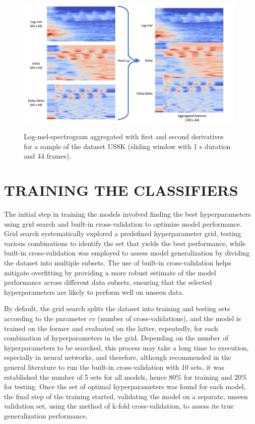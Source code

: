 \begin{figure}[htbp]
    \raggedright
        \caption{Log-mel-spectrogram aggregated with first and second derivatives for a sample of the dataset US8K (sliding window with 1 \gls{s} duration and 44 frames).}
        \includegraphics[width=1\textwidth]{resources/images/050-methods/Methods_feature_extraction_3_US8K.jpg}
        \label{fig:methods_feature_extraction_log-mel_spectrogram}
\end{figure}

\section{TRAINING THE CLASSIFIERS}
\label{sec:methods_training_classifiers}

The initial step in training the models involved finding the best hyperparameters using grid search and built-in cross-validation \cite{scikitle61} to optimize model performance. Grid search systematically explored a predefined hyperparameter grid, testing various combinations to identify the set that yields the best performance, while built-in cross-validation was employed to assess model generalization by dividing the dataset into multiple subsets. The use of built-in cross-validation helps mitigate overfitting by providing a more robust estimate of the model performance across different data subsets, ensuring that the selected hyperparameters are likely to perform well on unseen data.

By default, the grid search splits the dataset into training and testing sets according to the parameter $cv$ (number of cross-validations), and the model is trained on the former and evaluated on the latter, repeatedly, for each combination of hyperparameters in the grid. Depending on the number of hyperparameters to be searched, this process may take a long time to execution, especially in neural networks, and therefore, although recommended in the general literature to run the built-in cross-validation with 10 sets, it was established the number of 5 sets for all models, hence 80\% for training and 20\% for testing. Once the set of optimal hyperparameters was found for each model, the final step of the training started, validating the model on a separate, unseen validation set, using the method of k-fold cross-validation, to assess its true generalization performance. 

